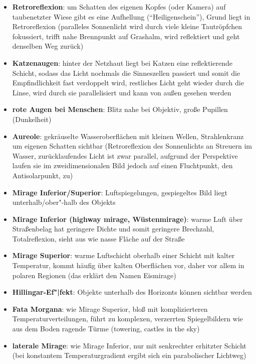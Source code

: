 \begin{itemize}
    \item
    \textbf{Retroreflexion}:
    um Schatten des eigenen Kopfes (oder Kamera) auf taubenetzter Wiese
    gibt es eine Aufhellung ("`Heiligenschein"'),
    Grund liegt in Retroreflexion (paralleles Sonnenlicht wird durch viele
    kleine Tautröpfchen fokussiert, trifft nahe Brennpunkt auf Grashalm, wird
    reflektiert und geht denselben Weg zurück)
    
    \item
    \textbf{Katzenaugen}:
    hinter der Netzhaut liegt bei Katzen eine reflektierende Schicht, sodass
    das Licht nochmals die Sinneszellen passiert und somit die Empfindlichkeit
    fast verdoppelt wird, restliches Licht geht wieder durch die Linse,
    wird durch sie parallelisiert und kann von außen gesehen werden
    
    \item
    \textbf{rote Augen bei Menschen}:
    Blitz nahe bei Objektiv, große Pupillen (Dunkelheit)
    
    \item
    \textbf{Aureole}:
    gekräuselte Wasseroberflächen mit kleinen Wellen, Strahlenkranz um eigenen
    Schatten sichtbar (Retroreflexion des Sonnenlichts an Streuern im Wasser,
    zurücklaufendes Licht ist zwar parallel, aufgrund der Perspektive laufen
    sie im zweidimensionalen Bild jedoch auf einen Fluchtpunkt, den
    Antisolarpunkt, zu)
\end{itemize}
\linie
\begin{itemize}
    \item
    \textbf{Mirage Inferior/Superior}:
    Luftspiegelungen,
    gespiegeltes Bild liegt unterhalb/ober"-halb des Objekts
    
    \item
    \textbf{Mirage Inferior (highway mirage, Wüstenmirage)}:
    warme Luft über Straßenbelag hat geringere Dichte und somit geringere
    Brechzahl, Totalreflexion, sieht aus wie nasse Fläche auf der Straße
    
    \item
    \textbf{Mirage Superior}:
    warme Luftschicht oberhalb einer Schicht mit kalter Temperatur,
    kommt häufig über kalten Oberflächen vor, daher vor allem in polaren
    Regionen (das erklärt den Namen Eismirage)
    
    \item
    \textbf{Hillingar-Ef"|fekt}:
    Objekte unterhalb des Horizonts können sichtbar werden
    
    \item
    \textbf{Fata Morgana}:
    wie Mirage Superior, bloß mit komplizierteren Temperaturverteilungen,
    führt zu komplexen, verzerrten Spiegelbildern wie aus dem Boden ragende
    Türme (towering, castles in the sky)
    
    \item
    \textbf{laterale Mirage}:
    wie Mirage Inferior, nur mit senkrechter erhitzter Schicht
    (bei konstantem Temperaturgradient ergibt sich ein parabolischer Lichtweg)
\end{itemize}
